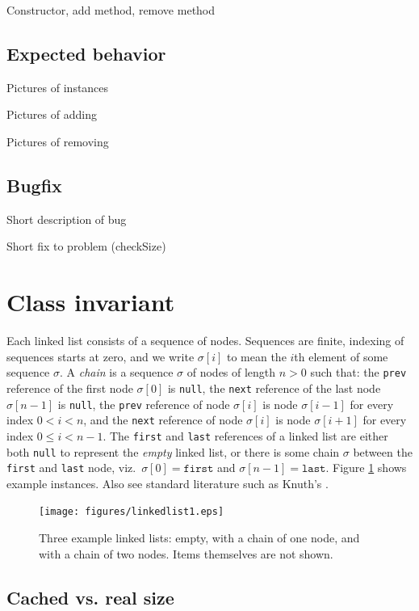 \documentclass[runningheads]{llncs}
\begin{document}
Constructor, add method, remove method

\subsection{Expected behavior}
Pictures of instances

Pictures of adding

Pictures of removing

\subsection{Bugfix}
Short description of bug

Short fix to problem (checkSize)

\section{Class invariant}\label{sec:class-invariant}

Each linked list consists of a sequence of nodes. Sequences are finite, indexing of sequences starts at zero, and we write $\sigma[i]$ to mean the $i$th element of some sequence $\sigma$. A \emph{chain} is a sequence $\sigma$ of nodes of length $n>0$ such that: the \texttt{prev} reference of the first node $\sigma[0]$ is \texttt{null}, the \texttt{next} reference of the last node $\sigma[n-1]$ is \texttt{null}, the \texttt{prev} reference of node $\sigma[i]$ is node $\sigma[i-1]$ for every index $0<i<n$, and the \texttt{next} reference of node $\sigma[i]$ is node $\sigma[i+1]$ for every index $0\leq i < n-1$. The \texttt{first} and \texttt{last} references of a linked list are either both \texttt{null} to represent the \emph{empty} linked list, or there is some chain $\sigma$ between the \texttt{first} and \texttt{last} node, viz.~$\sigma[0]=\mathtt{first}$ and $\sigma[n-1]=\mathtt{last}$. Figure \ref{fig:linkedlist} shows example instances.
Also see standard literature such as Knuth's \cite[Section 2.2.5]{knuth1997art}.

\begin{figure}[t]
  \centering
  \texttt{[image: figures/linkedlist1.eps]}
  \caption{Three example linked lists: empty, with a chain of one node, and with a chain of two nodes. Items themselves are not shown.}
  \label{fig:linkedlist}
\end{figure}

\subsection{Cached vs. real size}
\end{document}
